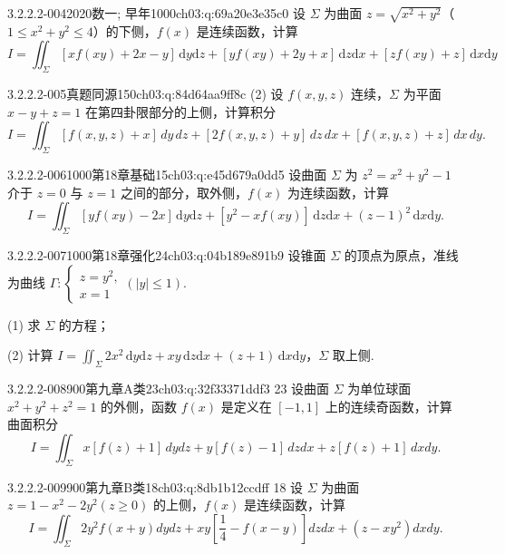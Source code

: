 \begin{q}{3.2.2.2-004}{2020数一; 早年1000}{ch03:q:69a20e3e35c0}
设 $\Sigma$ 为曲面 $z=\sqrt{x^2+y^2}$（$1\leqslant x^2+y^2\leqslant 4$）的下侧，$f(x)$ 是连续函数，计算
\[
I=\iint_{\Sigma}[xf(xy)+2x-y]\,\mathrm{d}y\mathrm{d}z+[yf(xy)+2y+x]\,\mathrm{d}z\mathrm{d}x+[zf(xy)+z]\,\mathrm{d}x\mathrm{d}y
\]
\end{q}

\begin{q}{3.2.2.2-005}{真题同源150}{ch03:q:84d64aa9ff8c}
(2) 设 $f(x,y,z)$ 连续，$\Sigma$ 为平面 $x-y+z=1$ 在第四卦限部分的上侧，计算积分
\[
I = \iint_{\Sigma} [f(x,y,z)+x]\,dy\,dz + [2f(x,y,z)+y]\,dz\,dx + [f(x,y,z)+z]\,dx\,dy.
\]
\end{q}

\begin{q}{3.2.2.2-006}{1000第18章基础15}{ch03:q:e45d679a0dd5}
设曲面 $\Sigma$ 为 $z^2=x^2+y^2-1$ 介于 $z=0$ 与 $z=1$ 之间的部分，取外侧，$f(x)$ 为连续函数，计算
\[
I=\iint_{\Sigma}[yf(xy)-2x]\,\mathrm{d}y\mathrm{d}z+[y^2-xf(xy)]\,\mathrm{d}z\mathrm{d}x+(z-1)^2\,\mathrm{d}x\mathrm{d}y.
\]
\end{q}

\begin{q}{3.2.2.2-007}{1000第18章强化24}{ch03:q:04b189e891b9}
设锥面 $\Sigma$ 的顶点为原点，准线为曲线 $\Gamma:\begin{cases} z=y^2,\\ x=1 \end{cases}(|y|\le 1).$

(1) 求 $\Sigma$ 的方程；

(2) 计算 $I=\displaystyle\iint_{\Sigma} 2x^2\,\mathrm{d}y\mathrm{d}z+xy\,\mathrm{d}z\mathrm{d}x+(z+1)\,\mathrm{d}x\mathrm{d}y$，$\Sigma$ 取上侧.
\end{q}

\begin{q}{3.2.2.2-008}{900第九章A类23}{ch03:q:32f33371ddf3}
23 设曲面 $\Sigma$ 为单位球面 $x^2+y^2+z^2=1$ 的外侧，函数 $f(x)$ 是定义在 $[-1,1]$ 上的连续奇函数，计算曲面积分
\[I=\iint_{\Sigma}x[f(z)+1]\,dydz+y[f(z)-1]\,dzdx+z[f(z)+1]\,dxdy.\]
\end{q}

\begin{q}{3.2.2.2-009}{900第九章B类18}{ch03:q:8db1b12ccdff}
18 设 $\Sigma$ 为曲面 $z=1-x^2-2y^2(z\ge0)$ 的上侧，$f(x)$ 是连续函数，计算
\[
I=\iint_\Sigma 2y^2f(x+y)dydz+xy\left[\frac14-f(x-y)\right]dzdx+(z-xy^2)dxdy.
\]
\end{q}

